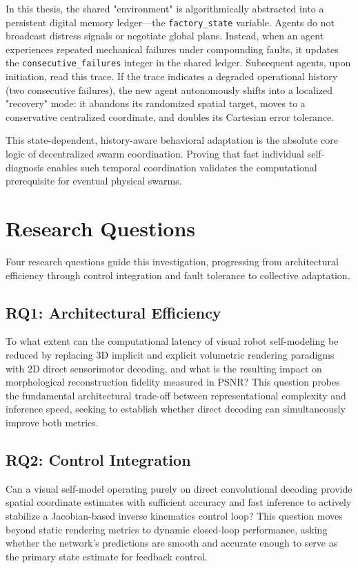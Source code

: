 \documentclass[12pt,a4paper,oneside]{report}
\begin{document}
In this thesis, the shared "environment" is algorithmically abstracted into a persistent digital memory ledger—the \texttt{factory\_state} variable. Agents do not broadcast distress signals or negotiate global plans. Instead, when an agent experiences repeated mechanical failures under compounding faults, it updates the \texttt{consecutive\_failures} integer in the shared ledger. Subsequent agents, upon initiation, read this trace. If the trace indicates a degraded operational history (two consecutive failures), the new agent autonomously shifts into a localized "recovery" mode: it abandons its randomized spatial target, moves to a conservative centralized coordinate, and doubles its Cartesian error tolerance.

This state-dependent, history-aware behavioral adaptation is the absolute core logic of decentralized swarm coordination. Proving that fast individual self-diagnosis enables such temporal coordination validates the computational prerequisite for eventual physical swarms.

\section{Research Questions}
\label{sec:research_questions}

Four research questions guide this investigation, progressing from architectural efficiency through control integration and fault tolerance to collective adaptation.

\subsection{RQ1: Architectural Efficiency}
\label{subsec:RQ1}

To what extent can the computational latency of visual robot self-modeling be reduced by replacing 3D implicit and explicit volumetric rendering paradigms with 2D direct sensorimotor decoding, and what is the resulting impact on morphological reconstruction fidelity measured in PSNR? This question probes the fundamental architectural trade-off between representational complexity and inference speed, seeking to establish whether direct decoding can simultaneously improve both metrics.

\subsection{RQ2: Control Integration}
\label{subsec:RQ2}

Can a visual self-model operating purely on direct convolutional decoding provide spatial coordinate estimates with sufficient accuracy and fast inference to actively stabilize a Jacobian-based inverse kinematics control loop? This question moves beyond static rendering metrics to dynamic closed-loop performance, asking whether the network's predictions are smooth and accurate enough to serve as the primary state estimate for feedback control.
\end{document}
